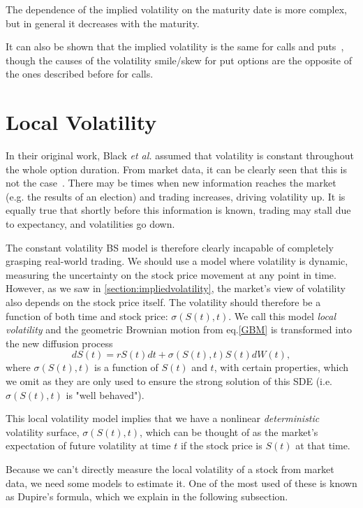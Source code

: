 The dependence of the implied volatility on the maturity date is more complex, but in general it decreases with the maturity.

It can also be shown that the implied volatility is the same for calls and puts~\citep{Hull}, though the causes of the volatility smile/skew for put options are the opposite of the ones described before for calls.






\section{Local Volatility}
\label{section:localvolatility}
In their original work, Black \textit{et al.} assumed that volatility is constant throughout the whole option duration. From market data, it can be clearly seen that this is not the case~\citep{DJIA}. There may be times when new information reaches the market  (e.g. the results of an election) and trading increases, driving volatility up. It is equally true that shortly before this information is known, trading may stall due to expectancy, and volatilities go down. 

The constant volatility BS model is therefore clearly incapable of completely grasping real-world trading. We should use a model where volatility is dynamic, measuring the uncertainty on the stock price movement at any point in time.
However, as we saw in \autoref{section:impliedvolatility}, the market's view of volatility also depends on the stock price itself.
The volatility should therefore be a function of both time and stock price: $\sigma(S(t),t)$. We call this model \emph{local volatility} and the geometric Brownian motion from eq.\eqref{GBM} is transformed into the new diffusion process
\begin{equation}\label{GBM2}
dS(t)=rS(t)dt+\sigma(S(t),t)S(t)dW(t),
\end{equation}
\noindent where $\sigma(S(t),t)$ is a function of $S(t)$ and $t$, with certain properties, which we omit as they are only used to ensure the strong solution of this SDE (i.e. $\sigma(S(t),t)$ is "well behaved").


This local volatility model implies that we have a nonlinear \emph{deterministic} volatility surface, $\sigma(S(t),t)$, which can be thought of as the market's expectation of future volatility at time $t$ if the stock price is $S(t)$ at that time.



Because we can't directly measure the local volatility of a stock from market data, we need some models to estimate it. One of the most used of these is known as Dupire's formula, which we explain in the following subsection.


